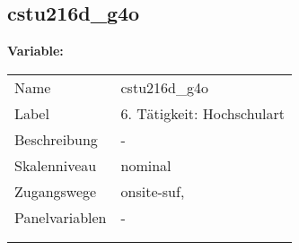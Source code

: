 	
	
	\subsection{cstu216d\_g4o}
	\label{subSection:cstu216d_g4o}

	\noindent\textbf{Variable:}\\
		\begin{tabular}{lL{11.3cm}}
			\label{tableVariable:cstu216d_g4o}
			Name & cstu216d\_g4o \\
			Label & 6. Tätigkeit: Hochschulart \\
			Beschreibung & - \\
			Skalenniveau & nominal \\
			Zugangswege &
				onsite-suf,
 \\
			Panelvariablen & -
			 \\
			 \\
 \\
		\end{tabular}






